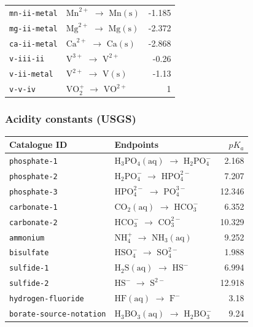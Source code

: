 \documentclass[a4paper,11pt]{ltxdoc}
\begin{document}
\begin{longtable}{@{}>{\raggedright\arraybackslash}p{42mm}p{87mm}r@{}}
\texttt{mn-ii-metal} & $\mathrm{Mn}^{2+}$ $\to$ $\mathrm{Mn}\mathrm{(s)}$ & -1.185\\
\texttt{mg-ii-metal} & $\mathrm{Mg}^{2+}$ $\to$ $\mathrm{Mg}\mathrm{(s)}$ & -2.372\\
\texttt{ca-ii-metal} & $\mathrm{Ca}^{2+}$ $\to$ $\mathrm{Ca}\mathrm{(s)}$ & -2.868\\
\texttt{v-iii-ii} & $\mathrm{V}^{3+}$ $\to$ $\mathrm{V}^{2+}$ & -0.26\\
\texttt{v-ii-metal} & $\mathrm{V}^{2+}$ $\to$ $\mathrm{V}\mathrm{(s)}$ & -1.13\\
\texttt{v-v-iv} & $\mathrm{V}\mathrm{O}_{2}^{+}$ $\to$ $\mathrm{V}\mathrm{O}^{2+}$ & 1\\
\end{longtable}

\subsubsection{Acidity constants (USGS)}
\begin{longtable}{@{}>{\raggedright\arraybackslash}p{42mm}p{87mm}r@{}}
Catalogue ID & Endpoints & $pK_a$\\\hline
\endhead
\texttt{phosphate-1} & $\mathrm{H}_{3}\mathrm{P}\mathrm{O}_{4}\mathrm{(aq)}$ $\to$ $\mathrm{H}_{2}\mathrm{P}\mathrm{O}_{4}^{-}$ & 2.168\\
\texttt{phosphate-2} & $\mathrm{H}_{2}\mathrm{P}\mathrm{O}_{4}^{-}$ $\to$ $\mathrm{H}\mathrm{P}\mathrm{O}_{4}^{2-}$ & 7.207\\
\texttt{phosphate-3} & $\mathrm{H}\mathrm{P}\mathrm{O}_{4}^{2-}$ $\to$ $\mathrm{P}\mathrm{O}_{4}^{3-}$ & 12.346\\
\texttt{carbonate-1} & $\mathrm{C}\mathrm{O}_{2}\mathrm{(aq)}$ $\to$ $\mathrm{H}\mathrm{C}\mathrm{O}_{3}^{-}$ & 6.352\\
\texttt{carbonate-2} & $\mathrm{H}\mathrm{C}\mathrm{O}_{3}^{-}$ $\to$ $\mathrm{C}\mathrm{O}_{3}^{2-}$ & 10.329\\
\texttt{ammonium} & $\mathrm{N}\mathrm{H}_{4}^{+}$ $\to$ $\mathrm{N}\mathrm{H}_{3}\mathrm{(aq)}$ & 9.252\\
\texttt{bisulfate} & $\mathrm{H}\mathrm{S}\mathrm{O}_{4}^{-}$ $\to$ $\mathrm{S}\mathrm{O}_{4}^{2-}$ & 1.988\\
\texttt{sulfide-1} & $\mathrm{H}_{2}\mathrm{S}\mathrm{(aq)}$ $\to$ $\mathrm{H}\mathrm{S}^{-}$ & 6.994\\
\texttt{sulfide-2} & $\mathrm{H}\mathrm{S}^{-}$ $\to$ $\mathrm{S}^{2-}$ & 12.918\\
\texttt{hydrogen-fluoride} & $\mathrm{H}\mathrm{F}\mathrm{(aq)}$ $\to$ $\mathrm{F}^{-}$ & 3.18\\
\texttt{borate-source-notation} & $\mathrm{H}_{3}\mathrm{B}\mathrm{O}_{3}\mathrm{(aq)}$ $\to$ $\mathrm{H}_{2}\mathrm{B}\mathrm{O}_{3}^{-}$ & 9.24\\
\end{longtable}
\end{document}
